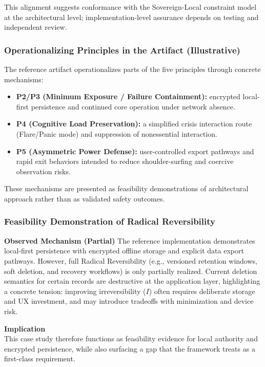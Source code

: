 \documentclass[12pt]{article}
\begin{document}
This alignment suggests conformance with the Sovereign-Local constraint model at the architectural level; implementation-level assurance depends on testing and independent review.

\subsubsection{Operationalizing Principles in the Artifact (Illustrative)}
The reference artifact operationalizes parts of the five principles through concrete mechanisms:
\begin{itemize}
\item \textbf{P2/P3 (Minimum Exposure / Failure Containment):} encrypted local-first persistence and continued core operation under network absence.
\item \textbf{P4 (Cognitive Load Preservation):} a simplified crisis interaction route (Flare/Panic mode) and suppression of nonessential interaction.
\item \textbf{P5 (Asymmetric Power Defense):} user-controlled export pathways and rapid exit behaviors intended to reduce shoulder-surfing and coercive observation risks.
\end{itemize}

These mechanisms are presented as feasibility demonstrations of architectural approach rather than as validated safety outcomes.

\subsubsection{Feasibility Demonstration of Radical Reversibility}
\textbf{Observed Mechanism (Partial)}
The reference implementation demonstrates local-first persistence with encrypted offline storage and explicit data export pathways. However, full Radical Reversibility (e.g., versioned retention windows, soft deletion, and recovery workflows) is only partially realized. Current deletion semantics for certain records are destructive at the application layer, highlighting a concrete tension: improving irreversibility ($I$) often requires deliberate storage and UX investment, and may introduce tradeoffs with minimization and device risk.

\textbf{Implication}\\
This case study therefore functions as feasibility evidence for local authority and encrypted persistence, while also surfacing a gap that the framework treats as a first-class requirement.
\end{document}
